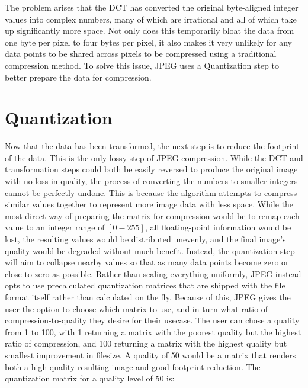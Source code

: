 \documentclass[11pt]{article}
\begin{document}
The problem arises that the DCT has converted the original byte-aligned integer values into complex numbers, many of which are irrational and all of which take up significantly more space.
Not only does this temporarily bloat the data from one byte per pixel to four bytes per pixel, it also makes it very unlikely for any data points to be shared across pixels to be compressed using a traditional compression method.
To solve this issue, JPEG uses a Quantization step to better prepare the data for compression.


\section{Quantization}
\label{sec: quantization}

Now that the data has been transformed, the next step is to reduce the footprint of the data.
This is the only lossy step of JPEG compression.
While the DCT and transformation steps could both be easily reversed to produce the original image with no loss in quality, the process of converting the numbers to smaller integers cannot be perfectly undone.
This is because the algorithm attempts to compress similar values together to represent more image data with less space.
While the most direct way of preparing the matrix for compression would be to remap each value to an integer range of $[0-255]$, all floating-point information would be lost, the resulting values would be distributed unevenly, and the final image's quality would be degraded without much benefit.
Instead, the quantization step will aim to collapse nearby values so that as many data points become zero or close to zero as possible.
Rather than scaling everything uniformly, JPEG instead opts to use precalculated quantization matrices that are shipped with the file format itself rather than calculated on the fly.
Because of this, JPEG gives the user the option to choose which matrix to use, and in turn what ratio of compression-to-quality they desire for their usecase.
The user can chose a quality from 1 to 100, with 1 returning a matrix with the poorest quality but the highest ratio of compression, and 100 returning a matrix with the highest quality but smallest improvement in filesize.
A quality of 50 would be a matrix that renders both a high quality resulting image and good footprint reduction.
The quantization matrix for a quality level of 50 is:
\end{document}
